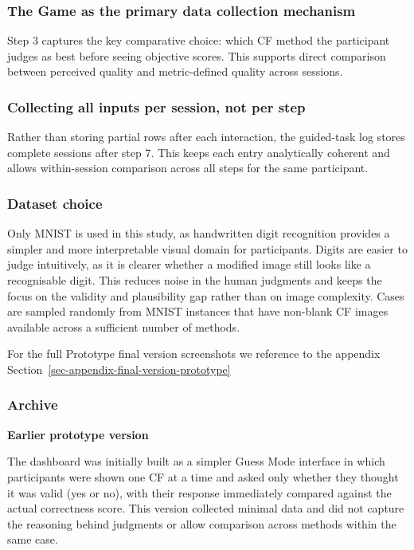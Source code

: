\documentclass[
  letterpaper,
  DIV=11,
  numbers=noendperiod]{scrartcl}
\begin{document}
\subsubsection{The Game as the primary data collection
mechanism}\label{the-game-as-the-primary-data-collection-mechanism}

Step 3 captures the key comparative choice: which CF method the
participant judges as best before seeing objective scores. This supports
direct comparison between perceived quality and metric-defined quality
across sessions.

\subsubsection{Collecting all inputs per session, not per
step}\label{collecting-all-inputs-per-session-not-per-step}

Rather than storing partial rows after each interaction, the guided-task
log stores complete sessions after step 7. This keeps each entry
analytically coherent and allows within-session comparison across all
steps for the same participant.

\subsubsection{Dataset choice}\label{dataset-choice}

Only MNIST is used in this study, as handwritten digit recognition
provides a simpler and more interpretable visual domain for
participants. Digits are easier to judge intuitively, as it is clearer
whether a modified image still looks like a recognisable digit. This
reduces noise in the human judgments and keeps the focus on the validity
and plausibility gap rather than on image complexity. Cases are sampled
randomly from MNIST instances that have non-blank CF images available
across a sufficient number of methods.

For the full Prototype final version screenshots we reference to the
appendix Section~\ref{sec-appendix-final-version-prototype}

\subsubsection{Archive}\label{archive}

\textbf{Earlier prototype version}

The dashboard was initially built as a simpler Guess Mode interface in
which participants were shown one CF at a time and asked only whether
they thought it was valid (yes or no), with their response immediately
compared against the actual correctness score. This version collected
minimal data and did not capture the reasoning behind judgments or allow
comparison across methods within the same case.
\end{document}
